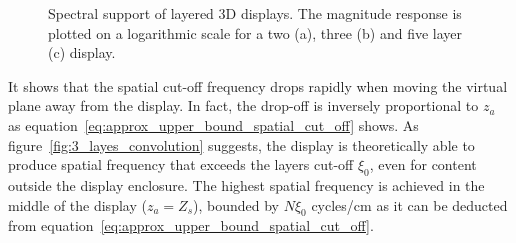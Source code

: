 \begin{figure}[tb]
	\hfill%
	\hfill%
	\caption[Spectral support of layered 3D displays]
			{Spectral support of layered 3D displays. 
			 The magnitude response is plotted on a logarithmic scale for a two (a), three (b) and five layer (c) display.}
	\label{fig:magnitude_response_2_3_5_layers}
\end{figure}
It shows that the spatial cut-off frequency drops rapidly when moving the virtual plane away from the display.
In fact, the drop-off is inversely proportional to $z_a$ as equation~\ref{eq:approx_upper_bound_spatial_cut_off} shows.
As figure~\ref{fig:3_layes_convolution} suggests, the display is theoretically able to produce spatial frequency that exceeds the layers cut-off $\xi_0$, even for content outside the display enclosure.
The highest spatial frequency is achieved in the middle of the display ($z_a = Z_s$), bounded by $N \xi_0$ cycles/cm as it can be deducted from equation~\ref{eq:approx_upper_bound_spatial_cut_off}.

